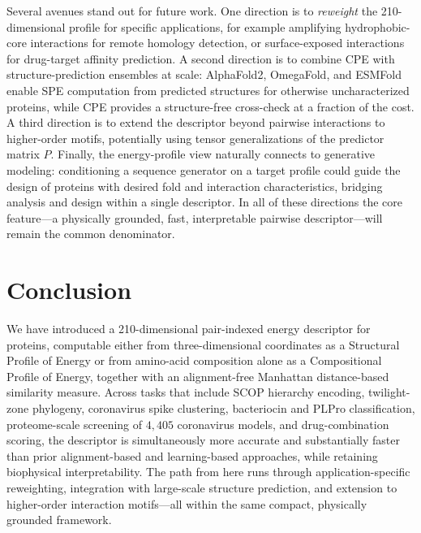 \documentclass[11pt]{article}
\begin{document}
Several avenues stand out for future work. One direction is to
\emph{reweight} the 210-dimensional profile for specific applications, for
example amplifying hydrophobic-core interactions for remote homology
detection, or surface-exposed interactions for drug-target affinity
prediction. A second direction is to combine CPE with structure-prediction
ensembles at scale: AlphaFold2, OmegaFold, and ESMFold enable SPE
computation from predicted structures for otherwise uncharacterized
proteins, while CPE provides a structure-free cross-check at a fraction of
the cost. A third direction is to extend the descriptor beyond pairwise
interactions to higher-order motifs, potentially using tensor generalizations
of the predictor matrix $P$. Finally, the energy-profile view naturally
connects to generative modeling: conditioning a sequence generator on a
target profile could guide the design of proteins with desired fold
and interaction characteristics, bridging analysis and design within a
single descriptor. In all of these directions the core feature---a
physically grounded, fast, interpretable pairwise descriptor---will remain
the common denominator.

\section{Conclusion}

We have introduced a 210-dimensional pair-indexed energy descriptor for
proteins, computable either from three-dimensional coordinates as a
Structural Profile of Energy or from amino-acid composition alone as a
Compositional Profile of Energy, together with an alignment-free Manhattan
distance-based similarity measure. Across tasks that include SCOP
hierarchy encoding, twilight-zone phylogeny, coronavirus spike clustering,
bacteriocin and PLPro classification, proteome-scale screening of
$4{,}405$ coronavirus models, and drug-combination scoring, the descriptor
is simultaneously more accurate and substantially faster than prior
alignment-based and learning-based approaches, while retaining biophysical
interpretability. The path from here runs through application-specific
reweighting, integration with large-scale structure prediction, and
extension to higher-order interaction motifs---all within the same compact,
physically grounded framework.


\end{document}
